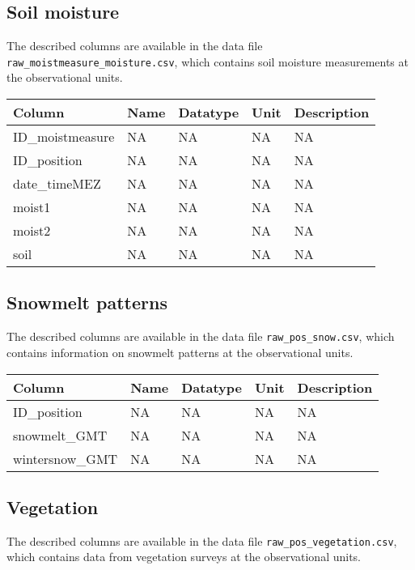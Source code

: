 \documentclass[
]{book}
\begin{document}
\hypertarget{soil-moisture}{%
\subsection{Soil moisture}\label{soil-moisture}}

The described columns are available in the data file \texttt{raw\_moistmeasure\_moisture.csv}, which contains soil moisture measurements at the observational units.

\begin{tabular}{lllll}
\toprule
Column & Name & Datatype & Unit & Description\\
\midrule
ID\_moistmeasure & NA & NA & NA & NA\\
ID\_position & NA & NA & NA & NA\\
date\_timeMEZ & NA & NA & NA & NA\\
moist1 & NA & NA & NA & NA\\
moist2 & NA & NA & NA & NA\\
\addlinespace
soil & NA & NA & NA & NA\\
\bottomrule
\end{tabular}

\hypertarget{snowmelt-patterns}{%
\subsection{Snowmelt patterns}\label{snowmelt-patterns}}

The described columns are available in the data file \texttt{raw\_pos\_snow.csv}, which contains information on snowmelt patterns at the observational units.

\begin{tabular}{lllll}
\toprule
Column & Name & Datatype & Unit & Description\\
\midrule
ID\_position & NA & NA & NA & NA\\
snowmelt\_GMT & NA & NA & NA & NA\\
wintersnow\_GMT & NA & NA & NA & NA\\
\bottomrule
\end{tabular}

\hypertarget{vegetation}{%
\subsection{Vegetation}\label{vegetation}}

The described columns are available in the data file \texttt{raw\_pos\_vegetation.csv}, which contains data from vegetation surveys at the observational units.
\end{document}
